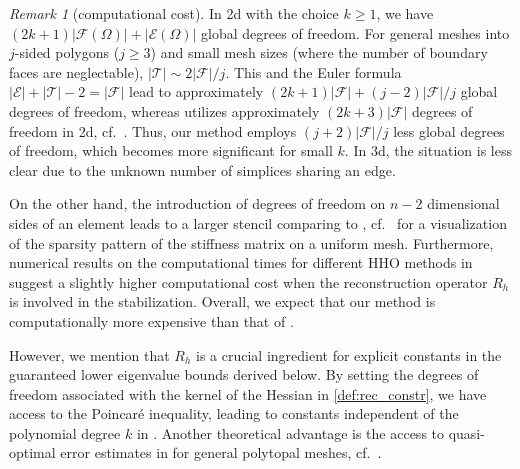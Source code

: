 \documentclass[a4paper]{amsart}
\numberwithin{equation}{section}
\theoremstyle{definition}
\theoremstyle{remark}
\newtheorem{remark}[theorem]{Remark}
\numberwithin{theorem}{section}
\numberwithin{equation}{section}
\numberwithin{table}{section}
\numberwithin{figure}{section}
\begin{document}
\begin{remark}[computational cost]\label{rem:computational-cost}
    In 2d with the choice $k \geq 1$, 
    we have $(2k+1)|\mathcal{F}(\Omega)| + |\mathcal{E}(\Omega)|$ global degrees of freedom.
    For general meshes into $j$-sided polygons ($j \geq 3$) and small mesh sizes (where the number of boundary faces are neglectable), $|\mathcal{T}| \sim 2|\mathcal{F}|/j$.
    This and the Euler formula $|\mathcal{E}| + |\mathcal{T}| - 2 = |\mathcal{F}|$ lead to approximately $(2k+1)|\mathcal{F}| + (j-2)|\mathcal{F}|/j$ global degrees of freedom, whereas \cite{DongErn2022} utilizes approximately $(2k+3)|\mathcal{F}|$ degrees of freedom in 2d, cf.~. Thus, our method employs $(j+2)|\mathcal{F}|/j$ less global degrees of freedom, which becomes more significant for small $k$.
    In 3d, the situation is less clear due to the unknown number of simplices sharing an edge.

    On the other hand,
    the introduction of degrees of freedom on $n-2$ dimensional sides of an element leads to a larger stencil comparing to \cite{DongErn2022}, cf.~ for a visualization of the sparsity pattern of the stiffness matrix on a uniform mesh.
    Furthermore, numerical results on the computational times for different HHO methods in \cite{DongErn2022} suggest a slightly higher computational cost when the reconstruction operator $R_h$ is involved in the stabilization.
    Overall, we expect that our method is computationally more expensive than that of \cite{DongErn2022}.

    However,
    we mention that $R_h$ is a crucial ingredient for explicit constants in the guaranteed lower eigenvalue bounds derived below. By setting the degrees of freedom associated with the kernel of the Hessian in \eqref{def:rec_constr}, we have access to the Poincar\'e inequality, leading to constants independent of the polynomial degree $k$ in .
    Another theoretical advantage is the access to quasi-optimal error estimates in  for general polytopal meshes, cf.~.
\end{remark}
\end{document}

